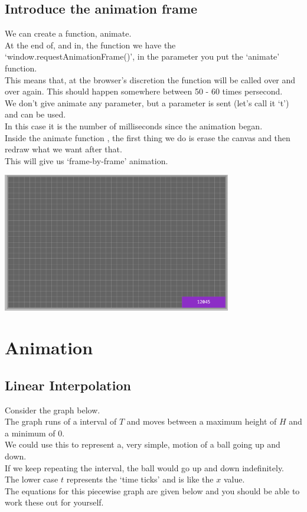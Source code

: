 \documentclass[a4paper,12pt]{article}
\begin{document}
\subsection{Introduce the animation frame}
We can create a function, animate.\\
At the end of, and in, the function we have the `window.requestAnimationFrame()', in the parameter you put the `animate' function.\\
This means that, at the browser's discretion the function will be called over and over again. This should happen somewhere between 50 - 60 times  persecond.\\
We don't give animate any parameter, but a parameter is sent (let's call it `t') and can be used.\\
In this case it is the number of milliseconds since the animation began.\\
Inside the animate function , the first thing we do is erase the canvas and then redraw what we want after that.\\
This will give us `frame-by-frame' animation.\\



\begin{center}
	\includegraphics[width=10cm, angle=0, origin=c,]{animationframe/animation_frame_running.png}
\end{center}
\newpage
\section{Animation}
\subsection{Linear Interpolation}
Consider the graph below.\\
The graph runs of a interval of $T$ and moves between a maximum height of $H$ and a minimum of $0$.\\
We could use this to represent a, very simple, motion of a ball going up and down.\\
If we keep repeating the interval, the ball would go up and down indefinitely.\\
The lower case $t$ represents the `time ticks' and is like the $x$ value.\\
The equations for this piecewise graph are given below and you should be able to work these out for yourself.\\
\end{document}
